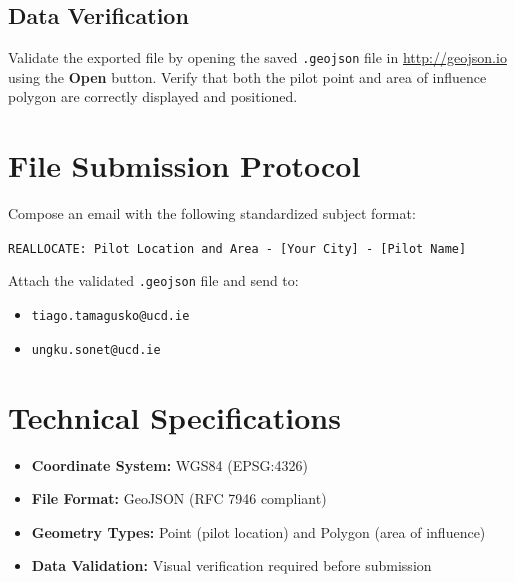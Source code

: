 \documentclass[11pt,a4paper]{article}
\begin{document}
\subsection{Data Verification}

Validate the exported file by opening the saved \texttt{.geojson} file in \url{http://geojson.io} using the \textbf{Open} button. Verify that both the pilot point and area of influence polygon are correctly displayed and positioned.

\section{File Submission Protocol}

Compose an email with the following standardized subject format:

\begin{center}
\texttt{REALLOCATE: Pilot Location and Area - [Your City] - [Pilot Name]}
\end{center}

Attach the validated \texttt{.geojson} file and send to:
\begin{itemize}
    \item \texttt{tiago.tamagusko@ucd.ie}
    \item \texttt{ungku.sonet@ucd.ie}
\end{itemize}

\section*{Technical Specifications}

\begin{itemize}
    \item \textbf{Coordinate System:} WGS84 (EPSG:4326)
    \item \textbf{File Format:} GeoJSON (RFC 7946 compliant)
    \item \textbf{Geometry Types:} Point (pilot location) and Polygon (area of influence)
    \item \textbf{Data Validation:} Visual verification required before submission
\end{itemize}

\vspace{1cm}
\end{document}
